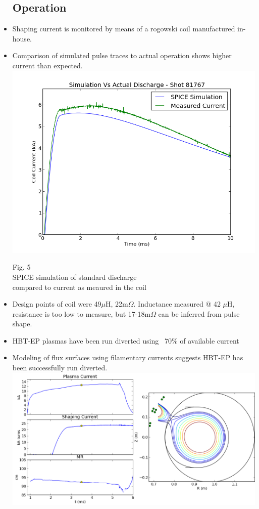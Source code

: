 \documentclass{article}
\begin{document}
\begin{multicols}{5}
\begin{itemize}
\subsection{Operation}
\item Shaping current is monitored by means of a rogowski coil manufactured in-house.
\item Comparison of simulated pulse traces to actual operation shows higher current than expected.
\includegraphics[width=0.9\columnwidth]{shaping_current_sim_vs_real_81797.png}
\begin{center}
Fig. 5\\
SPICE simulation of standard discharge\\
compared to current as meaured in the coil\\
\end{center}
\item Design points of coil were 49$\mu$H, 22m$\Omega$. Inductance measured @ 42 $\mu$H, resistance is too low to measure, but 17-18m$\Omega$ can be inferred from pulse shape.
\item HBT-EP plasmas have been run diverted using ~70$\%$ of available current
\item Modeling of flux surfaces using filamentary currents suggests HBT-EP has been successfully run diverted.\\
\vspace{.25in}
\includegraphics[width=0.9\columnwidth]{flux_surfaces_during_shaping.png}

\end{itemize}
\end{multicols}
\end{document}
